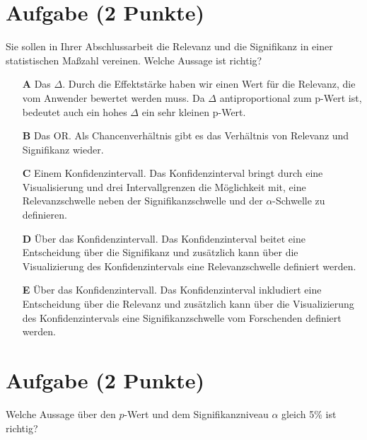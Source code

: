 \documentclass[a4paper, 9pt]{scrartcl}\usepackage[]{graphicx}\usepackage[]{xcolor}
\begin{document}
\section{Aufgabe \hfill (2 Punkte)}



Sie sollen in Ihrer Abschlussarbeit die Relevanz und die Signifikanz in einer statistischen Maßzahl vereinen. Welche Aussage ist richtig?



\begin{enumerate}
\item [\textbf{A} \msquare] Das $\Delta$. Durch die Effektstärke haben wir einen Wert für die Relevanz, die vom Anwender bewertet werden muss. Da $\Delta$ antiproportional zum p-Wert ist, bedeutet auch ein hohes $\Delta$ ein sehr kleinen p-Wert.
\item [\textbf{B} \msquare] Das OR. Als Chancenverhältnis gibt es das Verhältnis von Relevanz und Signifikanz wieder.
\item [\textbf{C} \msquare] Einem Konfidenzintervall. Das Konfidenzinterval bringt durch eine Visualisierung und drei Intervallgrenzen die Möglichkeit mit, eine Relevanzschwelle neben der Signifikanzschwelle und der $\alpha$-Schwelle zu definieren.
\item [\textbf{D} \msquare] Über das Konfidenzintervall. Das Konfidenzinterval beitet eine Entscheidung über die Signifikanz und zusätzlich kann über die Visualizierung des Konfidenzintervals eine Relevanzschwelle definiert werden.
\item [\textbf{E} \msquare] Über das Konfidenzintervall. Das Konfidenzinterval inkludiert eine Entscheidung über die Relevanz und zusätzlich kann über die Visualizierung des Konfidenzintervals eine Signifikanzschwelle vom Forschenden definiert werden.
\end{enumerate}

\section{Aufgabe \hfill (2 Punkte)}



Welche Aussage über den $p$-Wert und dem Signifikanzniveau $\alpha$ gleich 5\% ist richtig?
\end{document}
